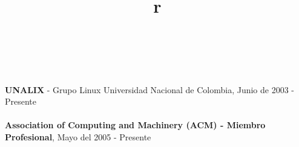\begin{resume}
\begin{formatb}
  \\
  \body\\
\end{formatb}
\employer{}
   {\textbf{UNALIX} - Grupo Linux Universidad Nacional de Colombia,
     Junio de 2003 - Presente \\ \\
    \textbf{Association of Computing and Machinery (ACM) - Miembro Profesional}, Mayo del  2005 - Presente

     }



\begin{formatb}
  \title{r}\\
  \\
 \body\\
\end{formatb}






\end{resume}
